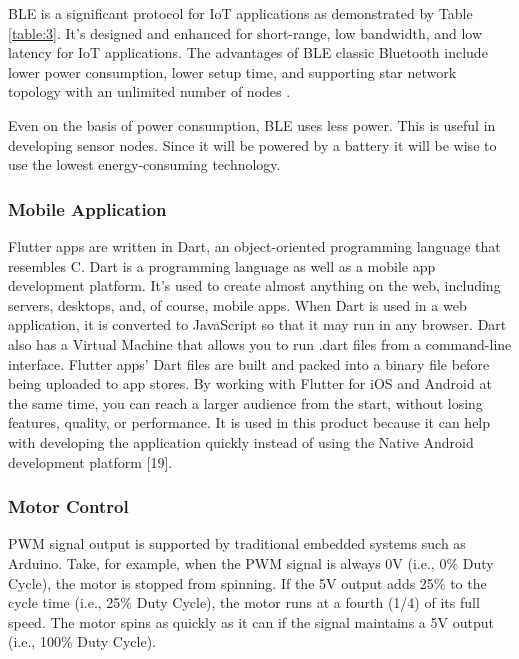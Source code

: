 \par
\ac{BLE} is a significant protocol for \ac{IoT} applications as demonstrated by Table \ref{table:3}. It’s designed and enhanced for short-range, low bandwidth, and low latency for \ac{IoT} applications. The advantages of \ac{BLE} classic Bluetooth include lower power consumption, lower setup time, and supporting star network topology with an unlimited number of nodes \cite{samie_iot_2016}. 
\par
Even on the basis of power consumption, \ac{BLE} uses less power. This is useful in developing sensor nodes. Since it will be powered by a battery it will be wise to use the lowest energy-consuming technology.

\subsubsection{Mobile Application}

Flutter apps are written in Dart, an object-oriented programming language that resembles C.
Dart is a programming language as well as a mobile app development platform. It's used to create almost anything on the web, including servers, desktops, and, of course, mobile apps.
When Dart is used in a web application, it is converted to JavaScript so that it may run in any browser. Dart also has a Virtual Machine that allows you to run .dart files from a command-line interface. Flutter apps' Dart files are built and packed into a binary file before being uploaded to app stores. By working with Flutter for \ac{iOS} and Android at the same time, you can reach a larger audience from the start, without losing features, quality, or performance.  It is used in this product because it can help with developing the application quickly instead of using the Native Android development platform [19].

\subsubsection{Motor Control}

\ac{PWM} signal output is supported by traditional embedded systems such as Arduino. Take, for example, when the \ac{PWM} signal is always 0V (i.e., 0\% Duty Cycle), the motor is stopped from spinning. If the 5V output adds 25\% to the cycle time (i.e., 25\% Duty Cycle), the motor runs at a fourth (1/4) of its full speed. The motor spins as quickly as it can if the signal maintains a 5V output (i.e., 100\% Duty Cycle).

